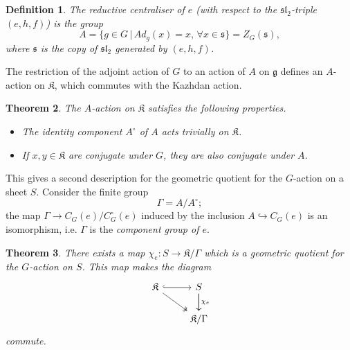 \documentclass{amsart}
\newtheorem{theorem}{Theorem}
\newtheorem{definition}[theorem]{Definition}
\theoremstyle{remark}
\numberwithin{theorem}{section}
\numberwithin{equation}{section}
\begin{document}
\begin{definition}\label{ReductiveCentraliserdef}
    The \emph{reductive centraliser} of $e$ (with respect to the $\mathfrak{sl}_2$-triple $(e,h,f)$) is the group
    \begin{equation}
        A = \{g \in G \, | \, Ad_g(x) = x, \, \forall x \in \mathfrak{s}\} = Z_G(\mathfrak{s}),
    \end{equation}
    where $\mathfrak{s}$ is the copy of $\mathfrak{sl}_2$ generated by $(e,h,f)$.
\end{definition}

The restriction of the adjoint action of $G$ to an action of $A$ on $\mathfrak{g}$ defines an $A$-action on $\mathfrak{K}$, which commutes with the Kazhdan action.

\begin{theorem}\label{RedCentraliseractionthm}\cite[Theorems 0.2 and 0.3]{Katsylo}
    The $A$-action on $\mathfrak{K}$ satisfies the following properties.
    \begin{itemize}
        \item The identity component $A^\circ$ of $A$ acts trivially on $\mathfrak{K}$.
        \item If $x, y \in \mathfrak{K}$ are conjugate under $G$, they are also conjugate under $A$.
    \end{itemize}
\end{theorem}

This gives a second description for the geometric quotient for the $G$-action on a sheet $S$. Consider the finite group
\begin{equation}\label{ComponentGroupeqn}
\Gamma = A/A^\circ;
\end{equation}
the map $\Gamma \rightarrow C_G(e)/C_G^\circ(e)$ induced by the inclusion $A \hookrightarrow C_G(e)$ is an isomorphism, i.e. $\Gamma$ is the \emph{component group of $e$}. 

\begin{theorem}\label{KatsyloGeometricQuotientthm}\cite[Theorem 0.4]{Katsylo}
There exists a map $\chi_e:S \rightarrow \mathfrak{K}/\Gamma$ which is a geometric quotient for the $G$-action on $S$. This map makes the diagram
\begin{equation}\label{KastyloGQeqn}
\begin{tikzcd}
\mathfrak{K} \arrow[rd, two heads] \arrow[r, hook] & S \arrow[d] \arrow[d, "\chi_e"] \\
                                                   & \mathfrak{K}/\Gamma            
\end{tikzcd}
\end{equation}
commute.
\end{theorem}
\end{document}
